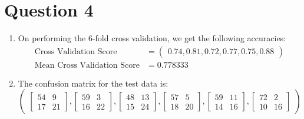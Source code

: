 \documentclass[12pt]{article}
\begin{document}
\section*{Question 4}
\begin{enumerate}[leftmargin=*]
    \item On performing the 6-fold cross validation, we get the following accuracies:
    \begin{align*}
        \text{Cross Validation Score} &= \begin{pmatrix} 0.74, 0.81, 0.72, 0.77, 0.75, 0.88 \end{pmatrix} \\
        \text{Mean Cross Validation Score} &= 0.778333
    \end{align*}

    \item The confusion matrix for the test data is:
    \[
    \begin{pmatrix}
        \begin{bmatrix}
            54 & 9 \\
            17 & 21 
        \end{bmatrix},
        \begin{bmatrix}
            59 & 3 \\
            16 & 22 
        \end{bmatrix},
        \begin{bmatrix}
            48 & 13 \\
            15 & 24 
        \end{bmatrix},
        \begin{bmatrix}
            57 & 5 \\
            18 & 20 
        \end{bmatrix},
        \begin{bmatrix}
            59 & 11 \\
            14 & 16 
        \end{bmatrix},
        \begin{bmatrix}
            72 & 2 \\
            10 & 16 
        \end{bmatrix}
    \end{pmatrix}
    \]


\end{enumerate}
\end{document}
